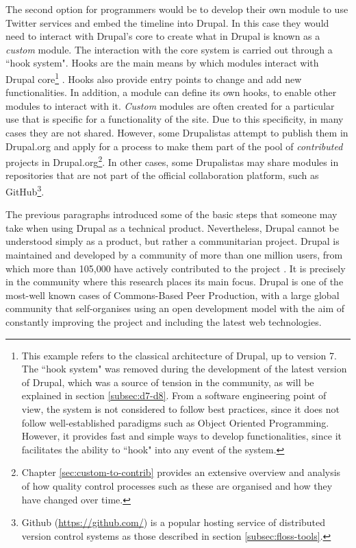The second option for programmers would be to develop their own module to use Twitter services and embed the timeline into Drupal. In this case they would need to interact with Drupal's core to create what in Drupal is known as a \textit{custom} module. The interaction with the core system is carried out through a ``hook system". Hooks are the main means by which modules interact with Drupal core\footnote{This example refers to the classical architecture of Drupal, up to version 7. The ``hook system" was removed during the development of the latest version of Drupal, which was a source of tension in the community, as will be explained in section \ref{subsec:d7-d8}. From a software engineering point of view, the system is not considered to follow best practices, since it does not follow well-established paradigms such as Object Oriented Programming. However, it provides fast and simple ways to develop functionalities, since it facilitates the ability to ``hook" into any event of the system.} \parencite{drupal-hooks:2016:Online}. Hooks also provide entry points to change and add new functionalities. In addition, a module can define its own hooks, to enable other modules to interact with it. \textit{Custom} modules are often created for a particular use that is specific for a functionality of the site. Due to this specificity, in many cases they are not shared. However, some Drupalistas attempt to publish them in Drupal.org and apply for a process to make them part of the pool of \textit{contributed} projects in Drupal.org\footnote{Chapter \ref{sec:custom-to-contrib} provides an extensive overview and analysis of how quality control processes such as these are organised and how they have changed over time.}. In other cases, some Drupalistas may share modules in repositories that are not part of the official collaboration platform, such as GitHub\footnote{Github (\url{https://github.com/}) is a popular hosting service of distributed version control systems as those described in section \ref{subsec:floss-tools}.}.

The previous paragraphs introduced some of the basic steps that someone may take when using Drupal as a technical product. Nevertheless, Drupal cannot be understood simply as a product, but rather a communitarian project. Drupal is maintained and developed by a community of more than one million users, from which more than 105,000 have actively contributed to the project \parencite{drupal-getting-involved:2017:Online}. It is precisely in the community where this research places its main focus. Drupal is one of the most-well known cases of Commons-Based Peer Production, with a large global community that self-organises using an open development model with the aim of constantly improving the project and including the latest web technologies.

